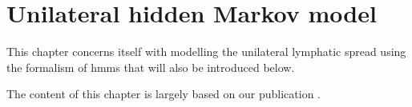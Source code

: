 \documentclass[\relativeRoot/main.tex]{subfiles}
\begin{document}
\chapter{Unilateral hidden Markov model}
\label{chap:unilateral}

This chapter concerns itself with modelling the unilateral lymphatic spread using the formalism of \glspl{hmm} that will also be introduced below.

The content of this chapter is largely based on our publication \cite{ludwig_hidden_2021}.











\end{document}
